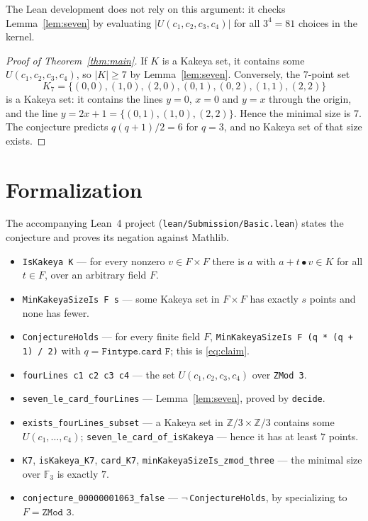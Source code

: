 \documentclass[11pt]{article}
\theoremstyle{plain}
\theoremstyle{definition}
\theoremstyle{remark}
\newcommand{\F}{\mathbb F}
\begin{document}
The Lean development does not rely on this argument: it checks
Lemma~\ref{lem:seven} by evaluating $|U(c_1,c_2,c_3,c_4)|$ for all $3^4=81$
choices in the kernel.

\begin{proof}[Proof of Theorem~\ref{thm:main}]
If $K$ is a Kakeya set, it contains some $U(c_1,c_2,c_3,c_4)$, so $|K|\ge7$ by
Lemma~\ref{lem:seven}. Conversely, the $7$-point set
\[
  K_7=\{(0,0),(1,0),(2,0),(0,1),(0,2),(1,1),(2,2)\}
\]
is a Kakeya set: it contains the lines $y=0$, $x=0$ and $y=x$ through the
origin, and the line $y=2x+1=\{(0,1),(1,0),(2,2)\}$. Hence the minimal size is
$7$. The conjecture predicts $q(q+1)/2=6$ for $q=3$, and no Kakeya set of that
size exists.
\end{proof}

\section{Formalization}

The accompanying Lean~4 project (\texttt{lean/Submission/Basic.lean}) states
the conjecture and proves its negation against Mathlib.

\begin{itemize}
  \item \texttt{IsKakeya K} --- for every nonzero $v\in F\times F$ there is $a$
    with $a+t\bullet v\in K$ for all $t\in F$, over an arbitrary field $F$.
  \item \texttt{MinKakeyaSizeIs F s} --- some Kakeya set in $F\times F$ has
    exactly $s$ points and none has fewer.
  \item \texttt{ConjectureHolds} --- for every finite field $F$,
    \texttt{MinKakeyaSizeIs F (q * (q + 1) / 2)} with
    $q=\texttt{Fintype.card F}$; this is \eqref{eq:claim}.
  \item \texttt{fourLines c1 c2 c3 c4} --- the set $U(c_1,c_2,c_3,c_4)$ over
    \texttt{ZMod 3}.
  \item \texttt{seven\_le\_card\_fourLines} --- Lemma~\ref{lem:seven},
    proved by \texttt{decide}.
  \item \texttt{exists\_fourLines\_subset} --- a Kakeya set in
    $\mathbb Z/3\times\mathbb Z/3$ contains some $U(c_1,\dots,c_4)$;
    \texttt{seven\_le\_card\_of\_isKakeya} --- hence it has at least $7$ points.
  \item \texttt{K7}, \texttt{isKakeya\_K7}, \texttt{card\_K7},
    \texttt{minKakeyaSizeIs\_zmod\_three} --- the minimal size over $\F_3$ is
    exactly $7$.
  \item \texttt{conjecture\_00000001063\_false} ---
    $\lnot\,$\texttt{ConjectureHolds}, by specializing to
    $F=\texttt{ZMod 3}$.
\end{itemize}
\end{document}
